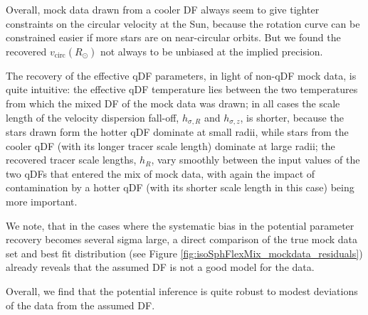 Overall, mock data drawn from a cooler DF always seem to give tighter constraints on the circular velocity at the Sun, because the rotation curve can be constrained easier if more stars are on near-circular orbits. But we found the recovered $v_\text{circ}(R_\odot)$ not always to be unbiased at the implied precision.

The recovery of the effective qDF parameters, in light of non-qDF mock data, is quite intuitive: the effective qDF temperature lies between the two temperatures from which the mixed DF of the mock data was drawn; in all cases the scale length of the velocity dispersion fall-off, $h_{\sigma,R}$ and $h_{\sigma,z}$, is shorter, because the stars drawn form the hotter qDF dominate at small radii, while stars from the cooler qDF (with its longer tracer scale length) dominate at large radii; the recovered tracer scale lengths, $h_R$, vary smoothly between the input values of the two qDFs that entered the mix of mock data, with again the impact of contamination by a hotter qDF (with its shorter scale length in this case) being more important. 

We note, that in the cases where the systematic bias in the potential parameter recovery becomes several sigma large, a direct comparison of the true mock data set and best fit distribution (see Figure \ref{fig:isoSphFlexMix_mockdata_residuals}) already reveals that the assumed DF is not a good model for the data.

Overall, we find that the potential inference is quite robust to modest deviations of the data from the assumed DF. 








